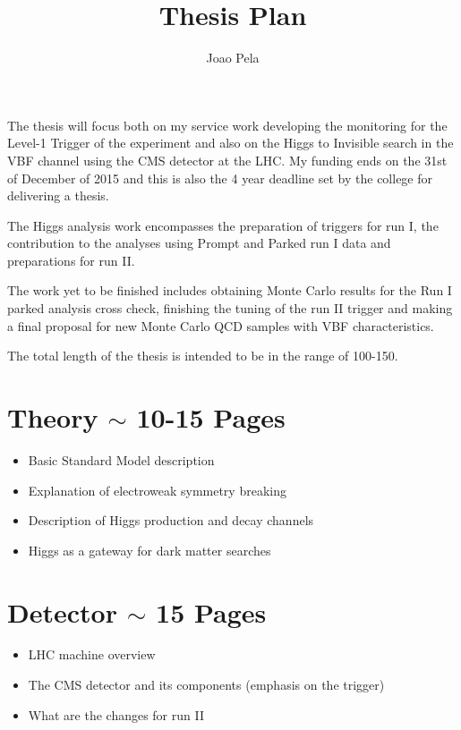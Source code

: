 \documentclass[a4paper,10pt]{article}
\title{Thesis Plan}
\author{Joao Pela}
\begin{document}
\maketitle

The thesis will focus both on my service work developing the monitoring for the Level-1 Trigger of the experiment and also on the Higgs to Invisible search in the VBF channel using the CMS detector at the LHC. My funding ends on the 31st of December of 2015 and this is also the 4 year deadline set  by the college for delivering a thesis.

The Higgs analysis work encompasses the preparation of triggers for run I, the contribution to the analyses using Prompt and Parked run I data and preparations for run II.

The work yet to be finished includes obtaining Monte Carlo results for the Run I parked analysis cross check, finishing the tuning of the run II trigger and making a final proposal for new Monte Carlo QCD samples with VBF characteristics. 

The total length of the thesis is intended to be in the range of 100-150.

\section{Theory $\sim$ 10-15 Pages}

\begin{itemize}
  \item Basic Standard Model description
  \item Explanation of electroweak symmetry breaking
  \item Description of Higgs production and decay channels
  \item Higgs as a gateway for dark matter searches
\end{itemize}

\section{Detector $\sim$ 15 Pages}

\begin{itemize}
  \item LHC machine overview
  \item The CMS detector and its components (emphasis on the trigger)
  \item What are the changes for run II 
\end{itemize}
\end{document}
